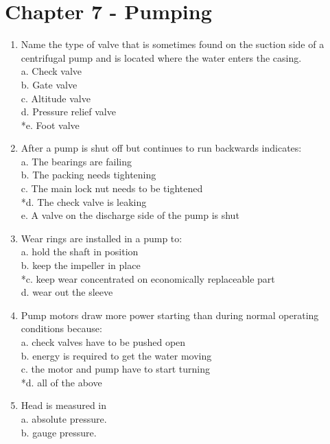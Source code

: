 \begin{enumerate}[1.]
\end{enumerate}

\newpage
\section{Chapter 7 - Pumping}

\begin{enumerate}[1.]
\item Name the type of valve that is sometimes found on the suction side of a centrifugal pump and is located where the water enters the casing.\\
a. Check valve\\
b. Gate valve\\
c. Altitude valve\\
d. Pressure relief valve\\
*e. Foot valve\\
\item After a pump is shut off but continues to run backwards indicates:\\
a. The bearings are failing\\
b. The packing needs tightening\\
c. The main lock nut needs to be tightened\\
*d. The check valve is leaking\\
e. A valve on the discharge side of the pump is shut\\
\item Wear rings are installed in a pump to:\\
a. hold the shaft in position\\
b. keep the impeller in place\\
*c. keep wear concentrated on economically replaceable part\\
d. wear out the sleeve\\
\item Pump motors draw more power starting than during normal operating conditions because:\\
a. check valves have to be pushed open\\
b. energy is required to get the water moving\\
c. the motor and pump have to start turning\\
*d. all of the above\\
\item Head is measured in\\
a. absolute pressure.\\
b. gauge pressure.\\

\end{enumerate}

